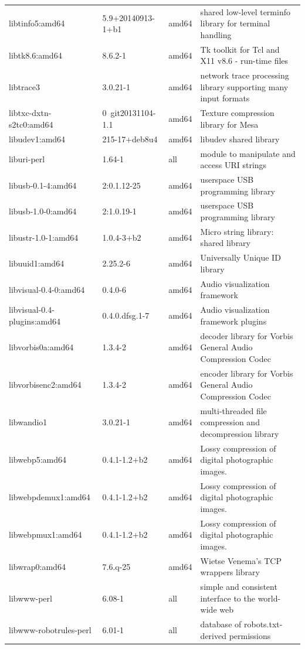 \documentclass[a4paper,10pt]{article}
\begin{document}
\begin{appendices}
{\begin{longtable}{p{3.25cm}@{\hspace{0.25cm}}p{4cm}@{\hspace{0.25cm}}l@{\hspace{0.25cm}}p{7cm}}
libtinfo5:amd64	&	5.9+20140913-1+b1	&	amd64	&	shared low-level terminfo library for terminal handling	\\
libtk8.6:amd64	&	8.6.2-1	&	amd64	&	Tk toolkit for Tcl and X11 v8.6 - run-time files	\\
libtrace3	&	3.0.21-1	&	amd64	&	network trace processing library supporting many input formats	\\
libtxc-dxtn-s2tc0:amd64	&	0~git20131104-1.1	&	amd64	&	Texture compression library for Mesa	\\
libudev1:amd64	&	215-17+deb8u4	&	amd64	&	libudev shared library	\\
liburi-perl	&	1.64-1	&	all	&	module to manipulate and access URI strings	\\
libusb-0.1-4:amd64	&	2:0.1.12-25	&	amd64	&	userspace USB programming library	\\
libusb-1.0-0:amd64	&	2:1.0.19-1	&	amd64	&	userspace USB programming library	\\
libustr-1.0-1:amd64	&	1.0.4-3+b2	&	amd64	&	Micro string library: shared library	\\
libuuid1:amd64	&	2.25.2-6	&	amd64	&	Universally Unique ID library	\\
libvisual-0.4-0:amd64	&	0.4.0-6	&	amd64	&	Audio visualization framework	\\
libvisual-0.4-plugins:amd64	&	0.4.0.dfsg.1-7	&	amd64	&	Audio visualization framework plugins	\\
libvorbis0a:amd64	&	1.3.4-2	&	amd64	&	decoder library for Vorbis General Audio Compression Codec	\\
libvorbisenc2:amd64	&	1.3.4-2	&	amd64	&	encoder library for Vorbis General Audio Compression Codec	\\
libwandio1	&	3.0.21-1	&	amd64	&	multi-threaded file compression and decompression library	\\
libwebp5:amd64	&	0.4.1-1.2+b2	&	amd64	&	Lossy compression of digital photographic images.	\\
libwebpdemux1:amd64	&	0.4.1-1.2+b2	&	amd64	&	Lossy compression of digital photographic images.	\\
libwebpmux1:amd64	&	0.4.1-1.2+b2	&	amd64	&	Lossy compression of digital photographic images.	\\
libwrap0:amd64	&	7.6.q-25	&	amd64	&	Wietse Venema's TCP wrappers library	\\
libwww-perl	&	6.08-1	&	all	&	simple and consistent interface to the world-wide web	\\
libwww-robotrules-perl	&	6.01-1	&	all	&	database of robots.txt-derived permissions	\\

\end{longtable}}
\end{appendices}
\end{document}
